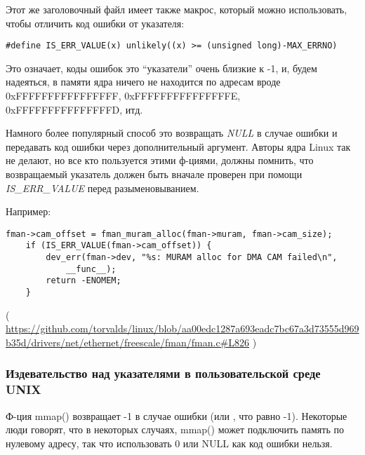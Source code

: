 Этот же заголовочный файл имеет также макрос, который можно использовать, чтобы отличить код ошибки от указателя:

\begin{lstlisting}[style=customc]
#define IS_ERR_VALUE(x) unlikely((x) >= (unsigned long)-MAX_ERRNO)
\end{lstlisting}

Это означает, коды ошибок это ``указатели'' очень близкие к -1, и, будем надеяться, в памяти ядра ничего не находится
по адресам вроде 0xFFFFFFFFFFFFFFFF, 0xFFFFFFFFFFFFFFFE, 0xFFFFFFFFFFFFFFFD, итд.

Намного более популярный способ это возвращать \emph{NULL} в случае ошибки и передавать код ошибки через дополнительный
аргумент.
Авторы ядра Linux так не делают, но все кто пользуется этими ф-циями, должны помнить, что возвращаемый указатель
должен быть вначале проверен при помощи \emph{IS\_ERR\_VALUE} перед разыменовыванием.

Например:

\begin{lstlisting}[style=customc]
	fman->cam_offset = fman_muram_alloc(fman->muram, fman->cam_size);
	if (IS_ERR_VALUE(fman->cam_offset)) {
		dev_err(fman->dev, "%s: MURAM alloc for DMA CAM failed\n",
			__func__);
		return -ENOMEM;
	}
\end{lstlisting}

( \url{https://github.com/torvalds/linux/blob/aa00edc1287a693eadc7bc67a3d73555d969b35d/drivers/net/ethernet/freescale/fman/fman.c#L826} )

\subsubsection{Издевательство над указателями в пользовательской среде UNIX}

Ф-ция mmap() возвращает -1 в случае ошибки (или , что равно -1).
Некоторые люди говорят, что в некоторых случаях, mmap() может подключить память по нулевому адресу, так что использовать
0 или NULL как код ошибки нельзя.

